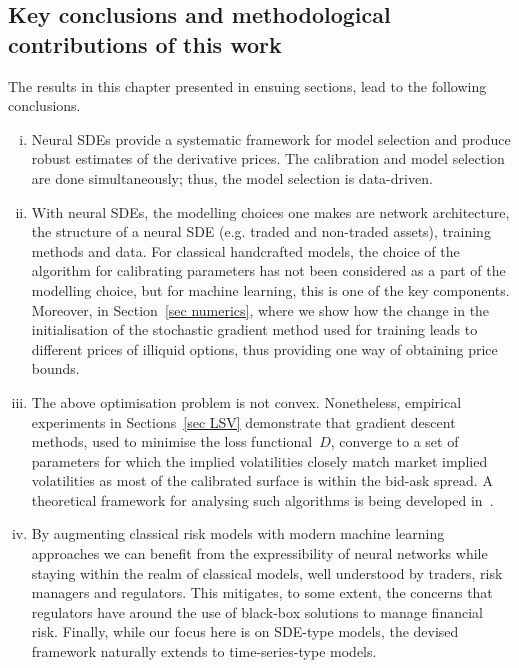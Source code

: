 
\subsection{Key conclusions and methodological contributions of this work}
The results in this chapter presented in ensuing sections, lead to the following conclusions. 
\begin{enumerate}[i)]
\item Neural SDEs provide a systematic framework for model selection and produce robust estimates of the derivative prices. 
The calibration and model selection are done simultaneously; thus, the model selection is data-driven. 
\item With neural SDEs, the modelling choices one makes are network architecture, the structure of a neural SDE (e.g. traded and non-traded assets), training methods and data. 
For classical handcrafted models, the choice of the algorithm for calibrating parameters has not been considered as a part of the modelling choice, but for machine learning, this is one of the key components. 
Moreover, in Section~\ref{sec numerics}, where we show how the change in the initialisation of the stochastic gradient method used for training leads to different prices of illiquid options, thus providing one way of obtaining price bounds.

\item The above optimisation problem is not convex. 
Nonetheless, empirical experiments in Sections~\ref{sec LSV} demonstrate that gradient descent methods, used to minimise the loss functional~$D$, converge to a set of parameters for which the implied volatilities closely match market implied volatilities as most of the calibrated surface is within the bid-ask spread. 
A theoretical framework for analysing such algorithms is being developed in~\cite{Siska2020GradientProblems}.

\item By augmenting classical risk models with modern machine learning approaches we can benefit from the expressibility of neural networks while staying within the realm of classical models, well understood by traders, risk managers and regulators. 
This mitigates, to some extent, the concerns that regulators have around the use of black-box solutions to manage financial risk.
Finally, while our focus here is on SDE-type models, the devised framework naturally extends to time-series-type models.
\end{enumerate}
